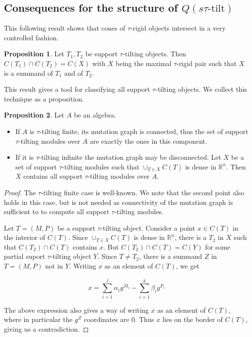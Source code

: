\documentclass[]{article}
\theoremstyle{definition}
\newtheorem{proposition}{Proposition}[section]
\newcommand{\tu}{\ensuremath{\tau}}
\begin{document}
\subsection{Consequences for the structure of $Q(s\tu\text{-tilt})$}


This following result shows that cones of $\tau$-rigid objects intersect in a very controlled fashion.

\begin{proposition}\cite[Corollary 6.7, b)]{dij17}
	Let $T_1,T_2$ be support \tu-tilting objects. Then $C(T_1) \cap C(T_2) = C(X)$ with $X$ being the maximal \tu-rigid pair such that $X$ is a summand of $T_1$ and of $T_2$.
\end{proposition}

This result gives a tool for classifying all support \tu-tilting objects. We collect this technique as a proposition.

\begin{proposition}\cite{dij17}
	Let $A$ be an algebra.
	
	\begin{itemize}
		\item If $A$ is \tu-tilting finite, its mutation graph is connected, thus the set of support \tu-tilting modules over $A$ are exactly the ones in this component.
		\item If it is \tu-tilting infinite the mutation graph may be disconnected. Let $X$ be a set of support \tu-tilting modules such that $\cup_{T \in X} C(T)$ is dense in $\mathbb{R}^n$. Then $X$ contains all support \tu-tilting modules over $A$.
		
	\end{itemize}
\end{proposition}

\begin{proof}
	The \tu-tilting finite case is well-known. We note that the second point also holds in this case, but is not needed as connectivity of the mutation graph is sufficient to to compute all support \tu-tilting modules.
	
	Let $T = (M,P)$ be a support \tu-tilting object. Consider a point $x \in C(T)$ in the interior of $C(T)$. Since $\cup_{T \in X} C(T)$ is dense in $\mathbb{R}^n$, there is a $T_2$ in $X$ such that $C(T_2) \cap C(T)$ contains $x$. But $C(T_2)\cap C(T) = C(Y)$ for some partial suport \tu-tilting object $Y$. Since $T \neq T_2$, there is a summand $Z$ in $T = (M,P)$ not in $Y$. Writing $x$ as an element of $C(T)$, we get
	
	\[x = \sum_{i = 1}^{j} \alpha_ig^{M_i} - \sum_{i = 1}^{k}\beta_ig^{P_i}\]

	The above expression also gives a way of writing $x$ as an element of  $C(T)$, where in particular the $g^{Z}$ coordinates are $0$. Thus $x$ lies on the border of $C(T)$, giving us a contradiction.
	
\end{proof}
\end{document}
